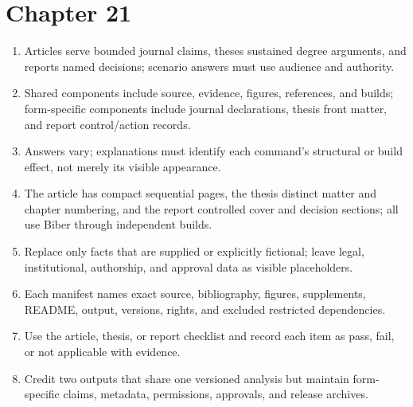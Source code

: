 \section*{Chapter 21}
\begin{enumerate}[label=21.\arabic*,leftmargin=2.4em,itemsep=0.45em]
  \item Articles serve bounded journal claims, theses sustained degree arguments,
        and reports named decisions; scenario answers must use audience and authority.
  \item Shared components include source, evidence, figures, references, and
        builds; form-specific components include journal declarations, thesis
        front matter, and report control/action records.
  \item Answers vary; explanations must identify each command's structural or
        build effect, not merely its visible appearance.
  \item The article has compact sequential pages, the thesis distinct matter and
        chapter numbering, and the report controlled cover and decision sections;
        all use Biber through independent builds.
  \item Replace only facts that are supplied or explicitly fictional; leave
        legal, institutional, authorship, and approval data as visible placeholders.
  \item Each manifest names exact source, bibliography, figures, supplements,
        README, output, versions, rights, and excluded restricted dependencies.
  \item Use the article, thesis, or report checklist and record each item as
        pass, fail, or not applicable with evidence.
  \item Credit two outputs that share one versioned analysis but maintain
        form-specific claims, metadata, permissions, approvals, and release archives.
\end{enumerate}
